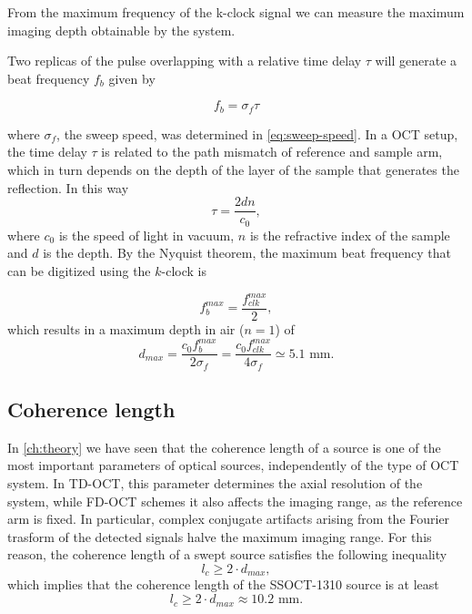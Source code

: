 From the maximum frequency of the k-clock signal we can measure the maximum imaging depth obtainable by the system. 

Two replicas of the pulse overlapping with a relative time delay $\tau$ will generate a beat frequency $f_b$ given by

	\begin{equation}
		f_b = \sigma_f \tau
	\end{equation}
	
where $\sigma_f$, the sweep speed, was determined in \autoref{eq:sweep-speed}. In a OCT setup, the time delay $\tau$ is related to the path mismatch of reference and sample arm, which in turn depends on the depth of the layer of the sample that generates the reflection. In this way	
	\begin{equation}
		\tau = \frac{2dn}{c_0},
	\end{equation}
where $c_0$ is the speed of light in vacuum, $n$ is the refractive index of the sample and $d$ is the depth. By the Nyquist theorem, the maximum beat frequency that can be digitized using the $k$-clock is
	
	\begin{equation}
		f_b^{max} = \frac{f_{clk}^{max}}{2},
	\end{equation}
which results in a maximum depth in air ($n=1$) of  
	\begin{equation}
		d_{max} = \frac{c_0 f_{b}^{max}}{2\sigma_f}  =  \frac{c_0 f_{clk}^{max}}{4\sigma_f} \simeq 5.1 \text{ mm}.
	\end{equation}

\subsection{Coherence length}
In \autoref{ch:theory} we have seen that the coherence length of a source is one of the most important parameters of optical sources, independently of the type of OCT system. In \ac{TD-OCT}, this parameter determines the axial resolution of the system, while \ac{FD-OCT} schemes it also affects the imaging range, as the reference arm is fixed. In particular, complex conjugate artifacts arising from the Fourier trasform of the detected signals halve the maximum imaging range. For this reason, the coherence length of a swept source satisfies the following inequality
\begin{equation}
	l_c \geq 2 \cdot d_{max},
\end{equation}
which implies that the coherence length of the SSOCT-1310 source is at least
\begin{equation}
	l_c \geq 2\cdot d_{max} \approx 10.2 \text{ mm.}
\end{equation}

